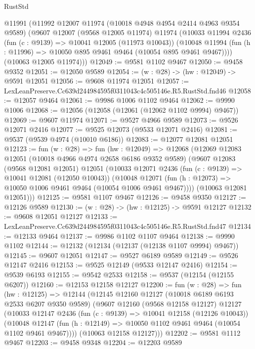 \begin{lexlean}{RustStd}
\begin{coremodule}
  @11991
    (@11992
      @12007
      @11974
      (@10018 @4948 @4954 @2414 @4963 @9354 @9589)
      (@9607
        @12007
        (@9568 @12005 @11974)
        @11974
        (@10033
          @11994
          @2436
          (fun (c : @9139) => @10041 @12005 (@11973 @10043))
          (@10048 @11994 (fun (h : @11996) => @10050 @895 @9461 @9464 (@10054 @895 @9461 @9467))))
        (@10063 @12005 @11974)))
@12049 := @9581 @1102 @9467
@12050 := @9458 @9352
@12051 := @12050 @9589
@12054 := (w : @28) -> (hw : @12049) -> @9591 @12051
@12056 := @9608 @11974 @12051
@12057 := LexLeanPreserve.Cc639d244984595f0311043c4c505146e.R5.RustStd.fnd46
@12058 := @12057 @9464
@12061 := @9986 @1006 @1102 @9464
@12062 := @9990 @1006
@12068 := @12056 (@12058 (@12061 (@12062 @1102 @9994) @9467))
@12069 := @9607 @11974
@12071 := @9527 @4966 @9589
@12073 := @9526 @12071 @2416
@12077 := @9525 @12073 (@9533 @12071 @2416)
@12081 := @9537 (@9539 @4974 (@10010 @6186))
@12083 := @12077 @12081 @12051
@12123 := fun (w : @28) =>
  fun (hw : @12049) =>
  @12068
    (@12069
      @12083
      @12051
      (@10018 @4966 @4974 @2658 @6186 @9352 @9589)
      (@9607
        @12083
        (@9568 @12081 @12051)
        @12051
        (@10033
          @12071
          @2436
          (fun (c : @9139) => @10041 @12081 (@12050 @10043))
          (@10048 @12071 (fun (h : @12073) => @10050 @1006 @9461 @9464 (@10054 @1006 @9461 @9467))))
        (@10063 @12081 @12051)))
@12125 := @9581 @1107 @9467
@12126 := @9458 @9350
@12127 := @12126 @9589
@12130 := (w : @28) -> (hw : @12125) -> @9591 @12127
@12132 := @9608 @12051 @12127
@12133 := LexLeanPreserve.Cc639d244984595f0311043c4c505146e.R5.RustStd.fnd47
@12134 := @12133 @9464
@12137 := @9986 @1102 @1107 @9464
@12138 := @9990 @1102
@12144 := @12132 (@12134 (@12137 (@12138 @1107 @9994) @9467))
@12145 := @9607 @12051
@12147 := @9527 @6189 @9589
@12149 := @9526 @12147 @2416
@12153 := @9525 @12149 (@9533 @12147 @2416)
@12154 := @9539 @6193
@12155 := @9542 @2533
@12158 := @9537 (@12154 (@12155 @6207))
@12160 := @12153 @12158 @12127
@12200 := fun (w : @28) =>
  fun (hw : @12125) =>
  @12144
    (@12145
      @12160
      @12127
      (@10018 @6189 @6193 @2533 @6207 @9350 @9589)
      (@9607
        @12160
        (@9568 @12158 @12127)
        @12127
        (@10033
          @12147
          @2436
          (fun (c : @9139) => @10041 @12158 (@12126 @10043))
          (@10048 @12147 (fun (h : @12149) => @10050 @1102 @9461 @9464 (@10054 @1102 @9461 @9467))))
        (@10063 @12158 @12127)))
@12202 := @9581 @1112 @9467
@12203 := @9458 @9348
@12204 := @12203 @9589

\end{coremodule}
\end{lexlean}
